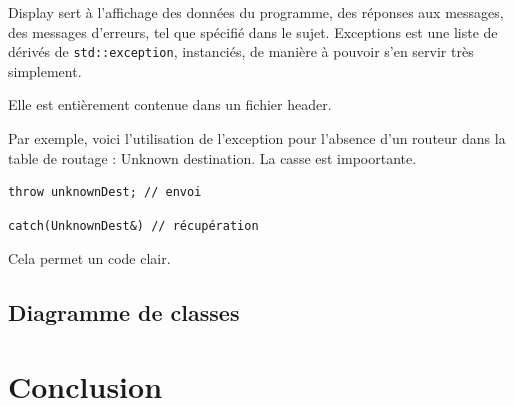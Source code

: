 \documentclass[a4paper,11pt]{article}
\begin{document}
Display sert à l'affichage des données du programme, des réponses aux messages, des messages d'erreurs, tel que spécifié dans le sujet.
Exceptions est une liste de dérivés de \texttt{std::exception}, instanciés, de manière à pouvoir s'en servir très simplement.

Elle est entièrement contenue dans un fichier header.

Par exemple, voici l'utilisation de l'exception pour l'absence d'un routeur dans la table de routage : Unknown destination.
La casse est impoortante.

\begin{lstlisting}
throw unknownDest; // envoi
\end{lstlisting}

\begin{lstlisting}
catch(UnknownDest&) // récupération
\end{lstlisting}

Cela permet un code clair.

\subsection{Diagramme de classes} %

\section*{Conclusion} %

\end{document}
